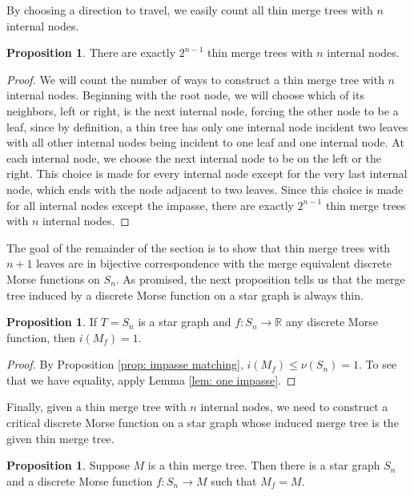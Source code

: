 \documentclass{article}
\theoremstyle{definition}
\newcommand{\RR}    {\mathbb{R}}
\newtheorem{prop}[thm]  {Proposition}
\begin{document}
By choosing a direction to travel, we easily count all thin merge trees with $n$ internal nodes.


\begin{prop}\label{prop: counting thin trees}
There are exactly $2^{n-1}$ thin merge trees with $n$ internal nodes.
\end{prop}

\begin{proof}
We will count the number of ways to construct a thin merge tree with $n$ internal nodes.   Beginning with the root node, we will choose which of its neighbors, left or right, is the next internal node, forcing the other node to be a leaf, since by definition, a thin tree has only one internal node incident two leaves with all other internal nodes being incident to one leaf and one internal node.  At each internal node, we choose the next internal node to be on the left or the right.  This choice is made for every internal node except for the very last internal node, which ends with the node adjacent to two leaves.  Since this choice is made for all internal nodes except the impasse, there are exactly $2^{n-1}$ thin merge trees with $n$ internal nodes.
\end{proof}


The goal of the remainder of the section is to show that thin merge trees with $n+1$ leaves are in bijective correspondence with the merge equivalent discrete Morse functions on $S_n$.  As promised, the next proposition tells us that the merge tree induced by a discrete Morse function on a star graph is always thin.


\begin{prop}\label{prop: star impass}
If $T=S_n$ is a star graph and $f\colon S_n\to \RR$ any discrete Morse function, then $i(M_f)= 1$.
\end{prop}

\begin{proof} By Proposition \ref{prop: impasse matching}, $i(M_f)\leq \nu(S_n)=1$.  To see that we have equality, apply Lemma \ref{lem: one impasse}.
\end{proof}

Finally, given a thin merge tree with $n$ internal nodes, we need to construct a critical discrete Morse function on a star graph whose induced merge tree is the given thin merge tree.

\begin{prop}\label{prop: dmf from thin} Suppose $M$ is a thin merge tree.  Then there is a star graph $S_n$ and a  discrete Morse function $f\colon S_n\to M$ such that $M_f=M.$
\end{prop}
\end{document}
